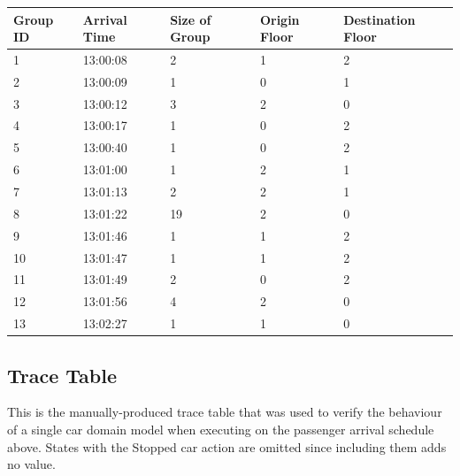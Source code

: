 \documentclass{UoYCSproject}
\begin{document}
\begin{appendices}
\begin{tabular}{l | l | l | l | l}
	Group ID & Arrival Time & Size of Group & Origin Floor & Destination Floor \\
	\hline
	1 & 13:00:08 & 2 & 1 & 2 \\
	2 & 13:00:09 & 1 & 0 & 1 \\
	3 & 13:00:12 & 3 & 2 & 0 \\
	4 & 13:00:17 & 1 & 0 & 2 \\
	5 & 13:00:40 & 1 & 0 & 2 \\
	6 & 13:01:00 & 1 & 2 & 1 \\
	7 & 13:01:13 & 2 & 2 & 1 \\
	8 & 13:01:22 & 19 & 2 & 0 \\
	9 & 13:01:46 & 1 & 1 & 2 \\
	10 & 13:01:47 & 1 & 1 & 2 \\
	11 & 13:01:49 & 2 & 0 & 2 \\
	12 & 13:01:56 & 4 & 2 & 0 \\
	13 & 13:02:27 & 1 & 1 & 0 \\	
\end{tabular}

\subsection{Trace Table}

This is the manually-produced trace table that was used to verify the behaviour of a single car domain model when executing on the passenger arrival schedule above.  States with the Stopped car action are omitted since including them adds no value.


\end{appendices}
\end{document}
